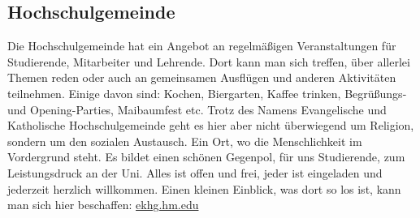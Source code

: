 \subsection{Hochschulgemeinde}
Die Hochschulgemeinde hat ein Angebot an regelmäßigen 
Veranstaltungen für Studierende, Mitarbeiter und Lehrende. Dort kann 
man sich treffen, über allerlei Themen reden oder auch an gemeinsamen 
Ausflügen und anderen Aktivitäten teilnehmen. Einige davon sind: 
Kochen, Biergarten, Kaffee trinken, Begrüßungs- und Opening-Parties, 
Maibaumfest etc. \doublebreak
Trotz des Namens \glqq Evangelische und Katholische Hochschulgemeinde\grqq{} 
geht es hier aber nicht überwiegend um Religion, sondern um den 
sozialen Austausch. Ein Ort, wo die Menschlichkeit im Vordergrund 
steht. Es bildet einen schönen Gegenpol, für uns Studierende, zum 
Leistungsdruck an der Uni. \doublebreak
Alles ist offen und frei, jeder ist eingeladen und jederzeit herzlich 
willkommen. \doublebreak
Einen kleinen Einblick, was dort so los ist, kann man sich hier beschaffen: 
\url{ekhg.hm.edu} 